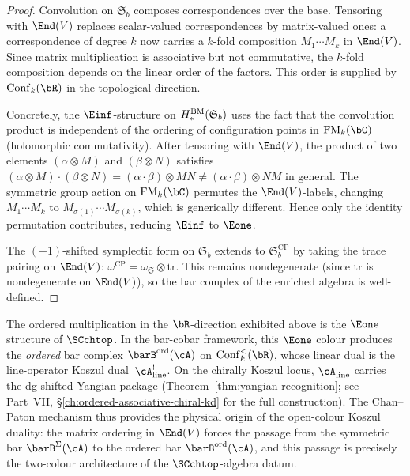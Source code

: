 \begin{proof}
Convolution on $\mathfrak{S}_b$ composes correspondences over the base.
Tensoring with $\End(V)$ replaces scalar-valued correspondences by
matrix-valued ones: a correspondence of degree $k$ now carries a $k$-fold
composition $M_1 \cdots M_k$ in $\End(V)$. Since matrix multiplication
is associative but not commutative, the $k$-fold composition depends on
the linear order of the factors. This order is supplied by $\Conf_k(\bR)$
in the topological direction.

Concretely, the $\Einf$-structure on $H_*^{\mathrm{BM}}(\mathfrak{S}_b)$ uses the
fact that the convolution product is independent of the ordering of
configuration points in $\FM_k(\bC)$ (holomorphic commutativity).
After tensoring with $\End(V)$, the product of two elements
$(\alpha \otimes M)$ and $(\beta \otimes N)$ satisfies
$(\alpha \otimes M) \cdot (\beta \otimes N)
= (\alpha \cdot \beta) \otimes MN
\neq (\alpha \cdot \beta) \otimes NM$
in general. The symmetric group action on $\FM_k(\bC)$ permutes the
$\End(V)$-labels, changing $M_1 \cdots M_k$ to $M_{\sigma(1)} \cdots
M_{\sigma(k)}$, which is generically different. Hence only the identity
permutation contributes, reducing $\Einf$ to $\Eone$.

The $(-1)$-shifted symplectic form on $\mathfrak{S}_b$ extends to
$\mathfrak{S}_b^{\mathrm{CP}}$ by taking the trace pairing on $\End(V)$:
$\omega^{\mathrm{CP}} = \omega_{\mathfrak{S}} \otimes \mathrm{tr}$.
This remains nondegenerate (since $\mathrm{tr}$ is nondegenerate on
$\End(V)$), so the bar complex of the enriched algebra is well-defined.
\end{proof}

\begin{remark}
\label{rem:ordered-mult-two-colour}
The ordered multiplication in the $\bR$-direction exhibited above is
the $\Eone$ structure of $\SCchtop$. In the bar-cobar framework, this
$\Eone$ colour produces the \emph{ordered} bar complex
$\barB^{\mathrm{ord}}(\cA)$ on $\Conf_k^<(\bR)$, whose linear dual
is the line-operator Koszul dual~$\cA^!_{\mathrm{line}}$. On the
chirally Koszul locus, $\cA^!_{\mathrm{line}}$ carries the dg-shifted
Yangian package (Theorem~\ref{thm:yangian-recognition}; see
Part~\textup{VII}, \S\ref{ch:ordered-associative-chiral-kd} for the full
construction). The Chan--Paton mechanism thus provides the physical
origin of the open-colour Koszul duality: the matrix ordering in
$\End(V)$ forces the passage from the symmetric bar
$\barB^{\Sigma}(\cA)$ to the ordered bar
$\barB^{\mathrm{ord}}(\cA)$, and this passage is precisely the
two-colour architecture of the $\SCchtop$-algebra datum.
\end{remark}

